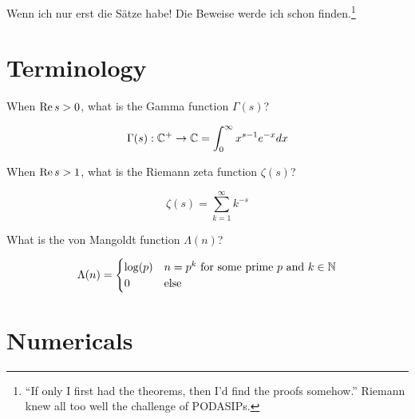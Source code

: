 \documentclass{homework}
\author{Alex Li}
\begin{document}
\maketitle

\begin{inspiration}
  Wenn ich nur erst die S\"atze habe! Die Beweise werde ich schon
    finden.\footnote{``If only I first had the theorems, then I'd find
        the proofs somehow.''  Riemann knew all too well the challenge of
            PODASIPs.} 
            \end{inspiration}

            \section{Terminology}

            \begin{problem}
              When $\operatorname{Re} s > 0$, what is the Gamma function $\Gamma(s)$?
              \end{problem}
              \begin{solution}
              \[
              \Gamma(s): \mathbb{C}^+ \to \mathbb{C} = \int_0^\infty x^{s-1}e^{-x}dx
              \]
              \end{solution}
              \begin{problem}
                When $\operatorname{Re} s > 1$, what is the Riemann zeta function $\zeta(s)$?
                \end{problem}
                \begin{solution}
                \[
                \zeta(s) = \sum_{k=1}^\infty k^{-s}
                \]
                \end{solution}
                \begin{problem}
                  What is the von Mangoldt function $\Lambda(n)$?
                  \end{problem}
                  \begin{solution}
                  \[
                  \Lambda(n) = \begin{cases}
                  \log(p) & n = p^k \text{ for some prime $p$ and $k\in \mathbb{N}$}\\
                  0 & \text{else}
                  \end{cases}
                  \]
                  \end{solution}
                  \section{Numericals}
\end{document}
